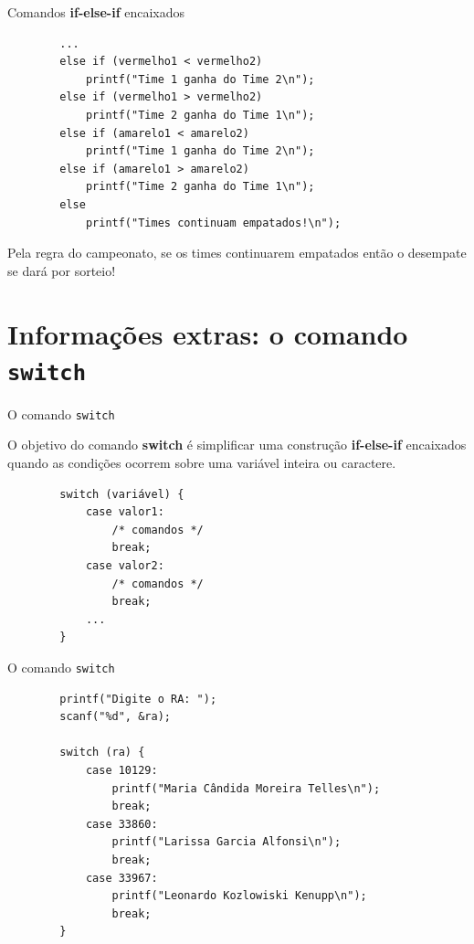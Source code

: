 \documentclass[handout]{beamer}
\begin{document}
\begin{frame}[fragile]{Comandos {\bf if-else-if} encaixados}

    \begin{verbatim}
        ...
        else if (vermelho1 < vermelho2)
            printf("Time 1 ganha do Time 2\n");
        else if (vermelho1 > vermelho2)
            printf("Time 2 ganha do Time 1\n");
        else if (amarelo1 < amarelo2)
            printf("Time 1 ganha do Time 2\n");
        else if (amarelo1 > amarelo2)
            printf("Time 2 ganha do Time 1\n");
        else
            printf("Times continuam empatados!\n");
    \end{verbatim}

    \pause
    Pela regra do campeonato, se os times continuarem empatados então o desempate se dará por sorteio!
\end{frame}


\section{Informações extras: o comando \texttt{switch}}

\begin{frame}[fragile]{O comando \texttt{switch}}

    O objetivo do comando {\bf switch} é simplificar uma construção {\bf if-else-if} encaixados quando as condições ocorrem sobre uma variável \alert{inteira} ou \alert{caractere}.

    \begin{verbatim}
        switch (variável) {
            case valor1:
                /* comandos */
                break;
            case valor2:
                /* comandos */
                break;
            ...
        }
    \end{verbatim}
\end{frame}

\begin{frame}[fragile]{O comando \texttt{switch}}

    \begin{verbatim}
        printf("Digite o RA: ");
        scanf("%d", &ra);

        switch (ra) {
            case 10129:
                printf("Maria Cândida Moreira Telles\n");
                break;
            case 33860:
                printf("Larissa Garcia Alfonsi\n");
                break;
            case 33967:
                printf("Leonardo Kozlowiski Kenupp\n");
                break;
        }
    \end{verbatim}
\end{frame}
\end{document}
